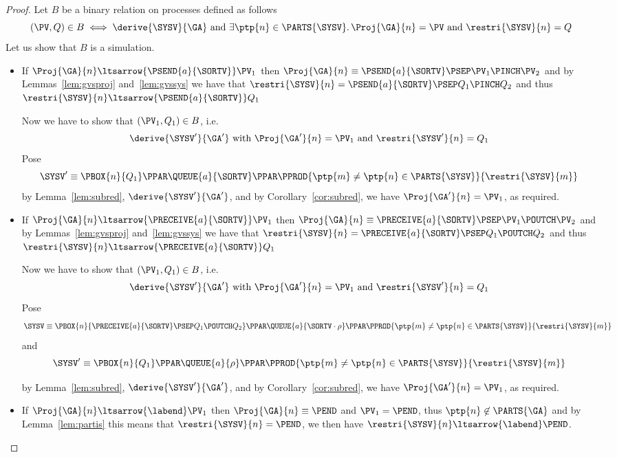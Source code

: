 
\thmsimu


\begin{proof}
  Let $B$ be a binary relation on processes defined as follows
  \[
  (\PV , Q) \in B
  \iff
  \derive{\SYSV}{\GA} \text{ and }
  \exists \ptp{n} \in \PARTS{\SYSV} . \, \Proj{\GA}{n} = \PV \text{ and }
  \restri{\SYSV}{n} = Q
  \]
  Let us show that $B$ is a simulation.
  \begin{itemize}
  \item If $\Proj{\GA}{n} \ltsarrow{\PSEND{a}{\SORTV}} \PV_1$
    then $\Proj{\GA}{n} \equiv \PSEND{a}{\SORTV} \PSEP \PV_1 \PINCH \PV_2 $
    and by Lemmas~\ref{lem:gvsproj} and~\ref{lem:gvssys}
    we have that $\restri{\SYSV}{n} = \PSEND{a}{\SORTV} \PSEP Q_1 \PINCH Q_2$
    and thus $\restri{\SYSV}{n} \ltsarrow{\PSEND{a}{\SORTV}} Q_1$

    Now we have to show that $(\PV_1 , Q_1) \in B$, i.e.
    \[
    \derive{\SYSV'}{\GA'} \text{ with } 
    \Proj{\GA'}{n} = \PV_1 \text{ and }
    \restri{\SYSV'}{n} = Q_1
    \]
    Pose
    \[\SYSV' \equiv
    \PBOX{n}{Q_1} \PPAR \QUEUE{a}{\SORTV} \PPAR
    \PPROD{\ptp{m}\neq \ptp{n} \in \PARTS{\SYSV}}{\restri{\SYSV}{m}}
    \]
    by Lemma~\ref{lem:subred}, $\derive{\SYSV'}{\GA'}$,
    and by Corollary~\ref{cor:subred}, we have
    $\Proj{\GA'}{n} = \PV_1$, as required.

\item If $\Proj{\GA}{n} \ltsarrow{\PRECEIVE{a}{\SORTV}} \PV_1$
    then $\Proj{\GA}{n} \equiv \PRECEIVE{a}{\SORTV} \PSEP \PV_1 \POUTCH \PV_2 $
    and by Lemmas~\ref{lem:gvsproj} and~\ref{lem:gvssys}
    we have that $\restri{\SYSV}{n} = \PRECEIVE{a}{\SORTV} \PSEP Q_1 \POUTCH Q_2$
    and thus $\restri{\SYSV}{n} \ltsarrow{\PRECEIVE{a}{\SORTV}} Q_1$
    
    Now we have to show that $(\PV_1 , Q_1) \in B$, i.e.
    \[
    \derive{\SYSV'}{\GA'} \text{ with } 
    \Proj{\GA'}{n} = \PV_1 \text{ and }
    \restri{\SYSV'}{n} = Q_1
    \]
    Pose
    \[
    \SYSV \equiv 
    \PBOX{n}{\PRECEIVE{a}{\SORTV} \PSEP Q_1 \POUTCH Q_2} \PPAR
    \QUEUE{a}{\SORTV \cdot \rho} \PPAR
    \PPROD{\ptp{m}\neq \ptp{n} \in \PARTS{\SYSV}}{\restri{\SYSV}{m}}
    \]
    and 
    \[
    \SYSV' \equiv 
    \PBOX{n}{Q_1} \PPAR 
    \QUEUE{a}{\rho} \PPAR
    \PPROD{\ptp{m}\neq\ptp{n} \in \PARTS{\SYSV}}{\restri{\SYSV}{m}}
    \]
    
    by Lemma~\ref{lem:subred}, $\derive{\SYSV'}{\GA'}$,
    and by Corollary~\ref{cor:subred}, we have
    $\Proj{\GA'}{n} = \PV_1$, as required.
    
  \item If  $\Proj{\GA}{n} \ltsarrow{\labend} \PV_1$
    then $\Proj{\GA}{n} \equiv \PEND$ and $\PV_1 = \PEND$,
    thus $\ptp{n} \not\in \PARTS{\GA}$
    and by Lemma~\ref{lem:partis} this means that $\restri{\SYSV}{n} = \PEND$,
    we then have $\restri{\SYSV}{n} \ltsarrow{\labend} \PEND$.
  \end{itemize}
\end{proof}





